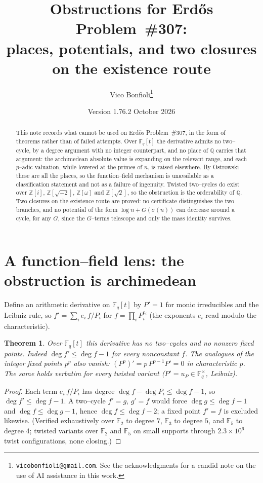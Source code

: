\documentclass[11pt]{article}
\title{Obstructions for Erd\H{o}s Problem~\#307:\\ places, potentials, and two closures on the existence route}
\author{Vico Bonfioli\thanks{\texttt{vicobonfioli@gmail.com}.
  See the acknowledgments for a candid note on the use of AI assistance in this work.}}
\date{Version 1.76.2\quad 18 October 2026}
\newtheorem{theorem}{Theorem}[section]
\theoremstyle{definition}
\begin{document}
\maketitle

\begin{abstract}
This note records what cannot be used on Erd\H{o}s Problem~\#307, in the form of theorems rather
than of failed attempts. Over $\mathbb{F}_q[t]$ the derivative admits no two--cycle, by a degree
argument with no integer counterpart, and no place of $\mathbb{Q}$ carries that argument: the
archimedean absolute value is expanding on the relevant range, and each $p$--adic valuation, while
lowered at the primes of $n$, is raised elsewhere. By Ostrowski these are all the places, so the
function--field mechanism is unavailable as a classification statement and not as a failure of
ingenuity. Twisted two--cycles do exist over $\mathbb{Z}[i]$, $\mathbb{Z}[\sqrt{-2}]$,
$\mathbb{Z}[\omega]$ and $\mathbb{Z}[\sqrt2]$, so the obstruction is the orderability of
$\mathbb{Q}$. Two closures on the existence route are proved: no certificate distinguishes the two
branches, and no potential of the form $\log n+G(\sigma(n))$ can decrease around a cycle, for any
$G$, since the $G$--terms telescope and only the mass identity survives.
\end{abstract}
\section{A function--field lens: the obstruction is archimedean}\label{sec:ff}

Define an arithmetic derivative on $\mathbb{F}_q[t]$ by $P'=1$ for monic irreducibles and the Leibniz
rule, so $f'=\sum_i e_i\,f/P_i$ for $f=\prod_i P_i^{e_i}$ (the exponents $e_i$ read modulo the
characteristic).

\begin{theorem}\label{thm:ff}
Over $\mathbb{F}_q[t]$ this derivative has no two--cycles and no nonzero fixed points. Indeed
$\deg f'\le\deg f-1$ for every nonconstant $f$. The analogues of the integer fixed points $p^{p}$ also
vanish: $(P^{p})'=p\,P^{p-1}P'=0$ in characteristic $p$. The same holds verbatim for every twisted
variant ($P'=u_P\in\mathbb{F}_q^\times$, Leibniz).
\end{theorem}
\begin{proof}
Each term $e_i\,f/P_i$ has degree $\deg f-\deg P_i\le\deg f-1$, so $\deg f'\le\deg f-1$. A two--cycle
$f'=g$, $g'=f$ would force $\deg g\le\deg f-1$ and $\deg f\le\deg g-1$, hence $\deg f\le\deg f-2$;
a fixed point $f'=f$ is excluded likewise. (Verified exhaustively over $\mathbb{F}_2$ to degree $7$,
$\mathbb{F}_3$ to degree $5$, and $\mathbb{F}_5$ to degree $4$; twisted variants over $\mathbb{F}_2$ and
$\mathbb{F}_5$ on small supports through $2.3\times10^{6}$ twist configurations, none closing.)
\end{proof}
\end{document}
